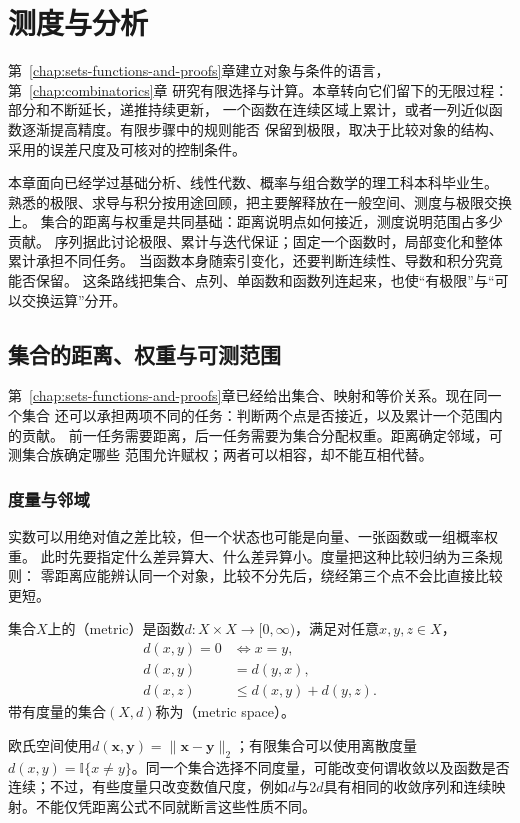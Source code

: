 \chapter{测度与分析}
\label{chap:mathematical-analysis}

第~\ref{chap:sets-functions-and-proofs}章建立对象与条件的语言，第~\ref{chap:combinatorics}章
研究有限选择与计算。本章转向它们留下的无限过程：部分和不断延长，递推持续更新，
一个函数在连续区域上累计，或者一列近似函数逐渐提高精度。有限步骤中的规则能否
保留到极限，取决于比较对象的结构、采用的误差尺度及可核对的控制条件。

本章面向已经学过基础分析、线性代数、概率与组合数学的理工科本科毕业生。
熟悉的极限、求导与积分按用途回顾，把主要解释放在一般空间、测度与极限交换上。
集合的距离与权重是共同基础：距离说明点如何接近，测度说明范围占多少贡献。
序列据此讨论极限、累计与迭代保证；固定一个函数时，局部变化和整体累计承担不同任务。
当函数本身随索引变化，还要判断连续性、导数和积分究竟能否保留。
这条路线把集合、点列、单函数和函数列连起来，也使“有极限”与“可以交换运算”分开。

\section{集合的距离、权重与可测范围}
\label{sec:analysis-set-structures}

第~\ref{chap:sets-functions-and-proofs}章已经给出集合、映射和等价关系。现在同一个集合
还可以承担两项不同的任务：判断两个点是否接近，以及累计一个范围内的贡献。
前一任务需要距离，后一任务需要为集合分配权重。距离确定邻域，可测集合族确定哪些
范围允许赋权；两者可以相容，却不能互相代替。

\subsection{度量与邻域}

实数可以用绝对值之差比较，但一个状态也可能是向量、一张函数或一组概率权重。
此时先要指定什么差异算大、什么差异算小。度量把这种比较归纳为三条规则：
零距离应能辨认同一个对象，比较不分先后，绕经第三个点不会比直接比较更短。
\begin{definition}[度量与度量空间]
\label{def:analysis-metric-space}
集合$X$上的（metric）是函数$d:X\times X\to[0,\infty)$，满足对任意$x,y,z\in X$，
\[
  \begin{aligned}
    d(x,y)=0&\Longleftrightarrow x=y,\\
    d(x,y)&=d(y,x),\\
    d(x,z)&\leq d(x,y)+d(y,z).
  \end{aligned}
\]
带有度量的集合$(X,d)$称为（metric space）。
\end{definition}
欧氏空间使用$d(\bm{x},\bm{y})=\lVert\bm{x}-\bm{y}\rVert_2$；有限集合可以使用离散度量$d(x,y)=\mathbb{I}\{x\neq y\}$。同一个集合选择不同度量，可能改变何谓收敛以及函数是否连续；不过，有些度量只改变数值尺度，例如$d$与$2d$具有相同的收敛序列和连续映射。不能仅凭距离公式不同就断言这些性质不同。

